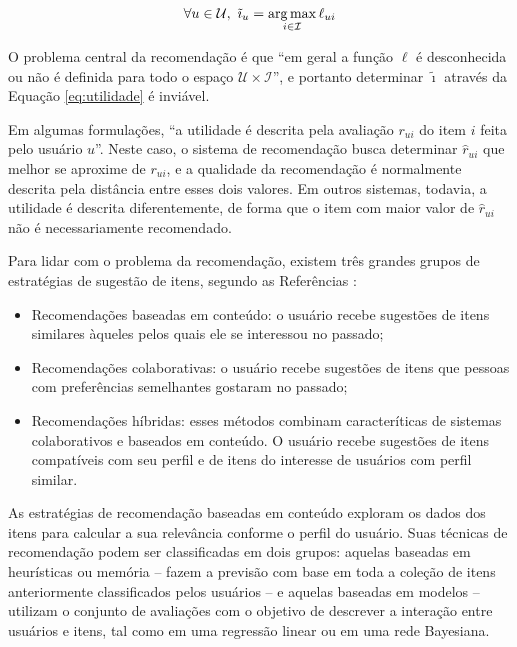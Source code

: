 \begin{equation} 
\label{eq:utilidade}
\forall u \in \mathcal{U}, ~ \tilde{\imath}_u = \operatorname*{arg\,max}_{i \in \mathcal{I}}{\ell_{ui}}
\end{equation}

O problema central da recomendação é que ``em geral a função $\ell$ é desconhecida ou não é definida para todo o espaço $\mathcal{U} \times \mathcal{I}$'', e portanto determinar $\tilde{\imath}$ através da Equação \ref{eq:utilidade} é inviável. 

Em algumas formulações, ``a utilidade é descrita pela avaliação $r_{ui}$ do item $i$ feita pelo usuário $u$''. Neste caso, o sistema de recomendação busca determinar $\hat{r}_{ui}$ que melhor se aproxime de $r_{ui}$, e a qualidade da recomendação é normalmente descrita pela distância entre esses dois valores. Em outros sistemas, todavia, a utilidade é descrita diferentemente, de forma que o item com maior valor de $\hat{r}_{ui}$ não é necessariamente recomendado. 

Para lidar com o problema da recomendação, existem três grandes grupos de estratégias de sugestão de itens, segundo as Referências :

\begin{itemize}
\item Recomendações baseadas em conteúdo: o usuário recebe sugestões de itens similares àqueles pelos quais ele se interessou no passado;
\item Recomendações colaborativas: o usuário recebe sugestões de itens que pessoas com preferências semelhantes gostaram no passado;
\item Recomendações híbridas: esses métodos combinam caracteríticas de sistemas colaborativos e baseados em conteúdo.  O usuário recebe sugestões de itens compatíveis com seu perfil e de itens do interesse de usuários com perfil similar.
\end{itemize}

As estratégias de recomendação baseadas em conteúdo exploram os dados dos itens para calcular a sua relevância conforme o perfil do usuário. Suas técnicas de recomendação podem ser classificadas em dois grupos: aquelas baseadas em heurísticas ou memória -- fazem a previsão com base em toda a coleção de itens anteriormente classificados pelos usuários -- e aquelas baseadas em modelos -- utilizam o conjunto de avaliações com o objetivo de descrever a interação entre usuários e itens, tal como em uma regressão linear ou em uma rede Bayesiana. 

